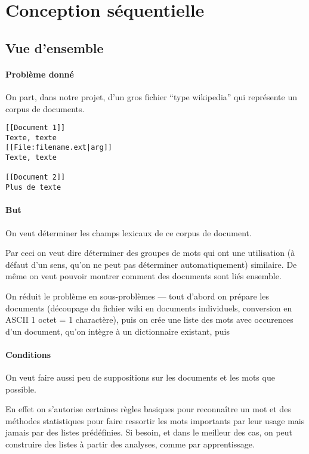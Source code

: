 \section{Conception séquentielle}

\subsection{Vue d'ensemble}

\paragraph{Problème donné}

On part, dans notre projet, d'un gros fichier
``type wikipedia'' qui représente un corpus de documents.
\begin{addmargin}{.5cm}
\begin{verbatim}
[[Document 1]]
Texte, texte
[[File:filename.ext|arg]]
Texte, texte

[[Document 2]]
Plus de texte
\end{verbatim}
\end{addmargin}

\paragraph{But}

On veut déterminer les champs lexicaux de ce corpus de document.

Par ceci on veut dire déterminer des groupes de mots
qui ont une utilisation (à défaut d'un sens, qu'on ne
peut pas déterminer automatiquement) similaire.
De même on veut pouvoir montrer comment des documents
sont liés ensemble.

On réduit le problème en sous-problèmes \----
tout d'abord on prépare les documents
(découpage du fichier wiki en documents individuels,
conversion en ASCII 1 octet = 1 charactère),
puis on crée une liste des mots avec occurences
d'un document, qu'on intègre à un dictionnaire
existant, puis

\paragraph{Conditions}

On veut faire aussi peu de suppositions sur les
documents et les mots que possible.

En effet on s'autorise certaines règles basiques pour
reconnaître un mot et des méthodes statistiques pour
faire ressortir les mots importants par leur usage
mais jamais par des listes prédéfinies.
Si besoin, et dans le meilleur des cas, on peut construire
des listes à partir des analyses, comme par apprentissage.
